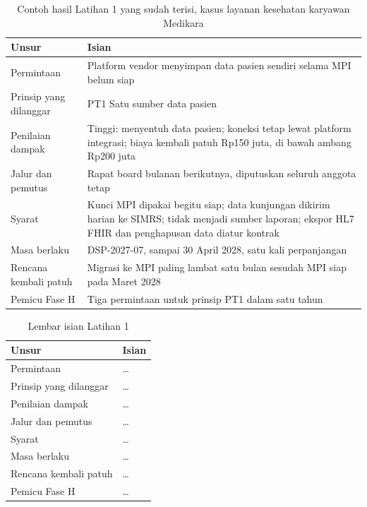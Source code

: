\begin{table}[!htb]
  \centering
  \caption{Contoh hasil Latihan 1 yang sudah terisi, kasus layanan kesehatan
           karyawan Medikara}
  \label{tab:ch14-lat1-contoh}
  \begin{tabularx}{\textwidth}{>{\raggedright\arraybackslash}p{3.0cm}>{\raggedright\arraybackslash}X}
    \hline
    \textbf{Unsur} & \textbf{Isian} \\
    \hline
    Permintaan & Platform vendor menyimpan data pasien sendiri selama MPI
      belum siap \\
    \hline
    Prinsip yang dilanggar & PT1 Satu sumber data pasien \\
    \hline
    Penilaian dampak & Tinggi: menyentuh data pasien; koneksi tetap lewat
      platform integrasi; biaya kembali patuh Rp150 juta, di bawah ambang
      Rp200 juta \\
    \hline
    Jalur dan pemutus & Rapat board bulanan berikutnya, diputuskan seluruh
      anggota tetap \\
    \hline
    Syarat & Kunci MPI dipakai begitu siap; data kunjungan dikirim harian ke
      SIMRS; tidak menjadi sumber laporan; ekspor HL7 FHIR dan penghapusan
      data diatur kontrak \\
    \hline
    Masa berlaku & DSP-2027-07, sampai 30 April 2028, satu kali perpanjangan \\
    \hline
    Rencana kembali patuh & Migrasi ke MPI paling lambat satu bulan sesudah
      MPI siap pada Maret 2028 \\
    \hline
    Pemicu Fase H & Tiga permintaan untuk prinsip PT1 dalam satu tahun \\
    \hline
  \end{tabularx}
\end{table}

\begin{table}[!htb]
  \centering
  \caption{Lembar isian Latihan 1}
  \label{tab:ch14-lat1-hasil}
  \begin{tabularx}{\textwidth}{>{\raggedright\arraybackslash}p{3.0cm}>{\raggedright\arraybackslash}X}
    \hline
    \textbf{Unsur} & \textbf{Isian} \\
    \hline
    Permintaan & \dots \\
    \hline
    Prinsip yang dilanggar & \dots \\
    \hline
    Penilaian dampak & \dots \\
    \hline
    Jalur dan pemutus & \dots \\
    \hline
    Syarat & \dots \\
    \hline
    Masa berlaku & \dots \\
    \hline
    Rencana kembali patuh & \dots \\
    \hline
    Pemicu Fase H & \dots \\
    \hline
  \end{tabularx}
\end{table}

